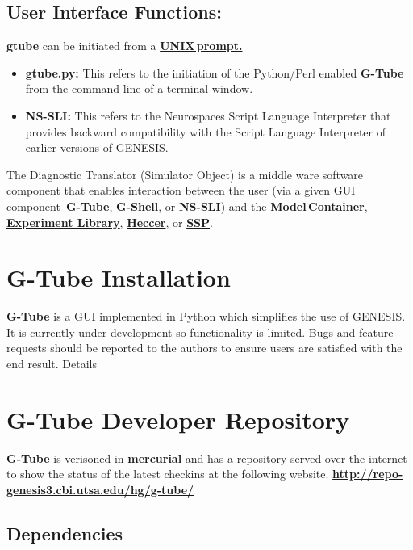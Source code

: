\documentclass[12pt]{article}
\begin{document}
\subsection*{User Interface Functions:} {\bf gtube} can be initiated from a \href{../unix-linux/unix-linux.tex}\bf {\bf UNIX\,prompt}. 

\begin{itemize}
   \item {\bf gtube.py:} This refers to the initiation of the Python/Perl enabled {\bf G-Tube} from the command line of a terminal window.
   \item {\bf NS-SLI:} This refers to the Neurospaces Script Language Interpreter that provides backward compatibility with the Script Language Interpreter of earlier versions of GENESIS.
\end{itemize}

The Diagnostic Translator (Simulator Object) is a middle ware software component that enables interaction between the user (via a given GUI component--{\bf G-Tube}, {\bf G-Shell}, or {\bf NS-SLI}) and the \href{../model-container/model-container.tex}{\bf Model\,Container}, \href{../experiment/experiment.tex}{\bf Experiment Library}, \href{../heccer/heccer.tex}{\bf Heccer}, or \href{../ssp/ssp.tex}{\bf SSP}.

\section*{G-Tube Installation}

{\bf G-Tube} is a GUI implemented in Python which simplifies the use of GENESIS. It is currently under development so functionality is limited. Bugs and feature requests should be reported to the authors to ensure users are satisfied with the end result.
Details

\section*{G-Tube Developer Repository}

{\bf G-Tube} is verisoned in \href{http://mercurial.selenic.com/}{\bf mercurial} and has a repository served over the internet to show the status of the latest checkins at the following website. \href{http://repo-genesis3.cbi.utsa.edu/hg/g-tube/}{\bf http://repo-genesis3.cbi.utsa.edu/hg/g-tube/}


\subsection*{Dependencies}
\end{document}
